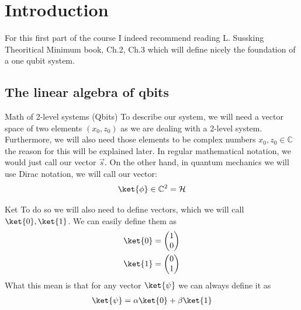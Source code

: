 \chapter{Introduction}
For this first part of the course I indeed recommend reading L. Sussking Theoritical Minimum book,  Ch.2, Ch.3 which will define nicely the foundation of a one qubit system.

\section{The linear algebra of qbits}

\begin{parag}{Math of 2-level systems (Qbits)}
	To describe our system, we will need a vector space of two elements $\left(x_0, z_0\right)$ as we are dealing with a 2-level system. Furthermore, we will also need those elements to be complex numbers $x_0, z_0 \in \mathbb{C}$ the reason for this will be explained later. In regular mathematical notation, we would just call our vector $\vec{s}$. On the other hand, in quantum mechanics we will use Dirac notation, we will call our vector:
	\begin{align*} 
		\ket{\phi} \in  \mathbb{C}^2 = \mathcal{H}
	\end{align*}

	\begin{subparag}{Ket}
	To do so we will also need to define  vectors, which we will call $\ket{0}, \ket{1}$. We can easily define them as 
	\begin{align*} 
		\ket{0} &= \begin{pmatrix} 1 \\ 0 \end{pmatrix}  \\
		\ket{1} &=  \begin{pmatrix} 0 \\ 1 \end{pmatrix} 
	\end{align*}
	What this mean is that for any vector $\ket{\psi}$ we can always define it as 
	\begin{align*} 
		\ket{\psi}  = \alpha \ket{0} + \beta \ket{1}
	\end{align*}



\end{subparag}
\end{parag}
